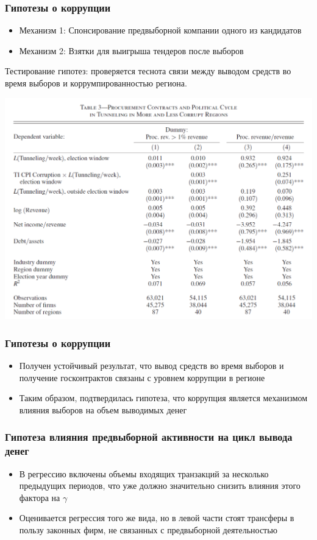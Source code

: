 \begin{frame}
\frametitle{Гипотезы о коррупции}
\begin{itemize}
	\item Механизм 1: Спонсирование предвыборной компании одного из кандидатов
	\item Механизм 2: Взятки для выигрыша тендеров после выборов 
\end{itemize}
Тестирование гипотез: проверяется теснота связи между выводом средств во время выборов и коррумпированностью региона. 
\begin{center}
\includegraphics[scale=0.17]{images/kek4}
\end{center}
\end{frame}

\begin{frame}
\frametitle{Гипотезы о коррупции}
\begin{itemize}
	\item Получен устойчивый результат, что вывод средств во время выборов и получение госконтрактов связаны с уровнем коррупции в регионе
	\item Таким образом, подтвердилась гипотеза, что коррупция является механизмом влияния выборов на объем выводимых денег  
\end{itemize}
\end{frame}

\begin{frame}
\frametitle{Гипотеза влияния предвыборной активности на цикл вывода денег}
\begin{itemize}
	\item В регрессию включены объемы входящих транзакций за несколько предыдущих периодов, что уже должно значительно снизить влияния этого фактора на $\gamma$
	\item Оценивается регрессия того же вида, но в левой части стоят трансферы в пользу законных фирм, не связанных с предвыборной деятельностью
\end{itemize}
\end{frame}

